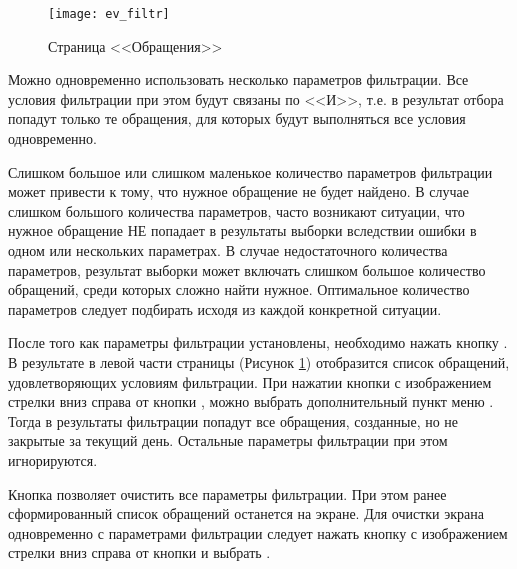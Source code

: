 \begin{figure}[ht]\centering
   \texttt{[image: ev\_filtr]}
   \caption{Страница <<Обращения>>}
   \label{img_ev_filtr}
 \end{figure}

Можно одновременно использовать несколько параметров фильтрации. Все условия фильтрации при этом будут связаны по <<И>>, т.е. в результат отбора попадут только те обращения, для которых будут выполняться все условия одновременно.

\begin{prim}
 Слишком большое или слишком маленькое количество параметров фильтрации может привести к тому, что нужное обращение не будет найдено. В случае слишком большого количества параметров, часто возникают ситуации, что нужное обращение НЕ попадает в результаты выборки вследствии ошибки в одном или нескольких параметрах. В случае недостаточного количества параметров, результат выборки может включать слишком большое количество обращений, среди которых сложно найти нужное. Оптимальное количество параметров следует подбирать исходя из каждой конкретной ситуации. 
\end{prim}

После того как параметры фильтрации установлены, необходимо нажать кнопку . В результате в левой части страницы (Рисунок \ref{img_ev_filtr}) отобразится список обращений, удовлетворяющих условиям фильтрации. При нажатии кнопки с изображением стрелки вниз справа от кнопки , можно выбрать дополнительный пункт меню . Тогда в результаты фильтрации попадут все обращения, созданные, но не закрытые за текущий день. Остальные параметры фильтрации при этом игнорируются.

Кнопка  позволяет очистить все параметры фильтрации. При этом ранее сформированный список обращений останется на экране. Для очистки экрана одновременно с параметрами фильтрации следует нажать кнопку с изображением стрелки вниз справа от кнопки  и выбрать .
